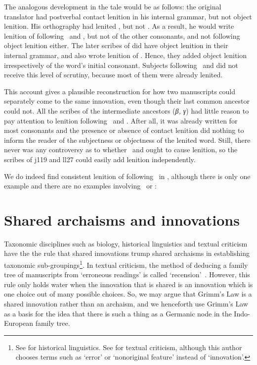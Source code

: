 The analogous development in the tale  would be as follows: the original translator had postverbal contact lenition in his internal grammar, but not object lenition. His orthography had lenited , but not . As a result, he would write lenition of  following \ei\ and , but not of the other consonants, and not following object lenition either. The later scribes of  did have object lenition in their internal grammar, and also wrote lenition of . Hence, they added object lenition irrespectively of the word's initial consonant. Subjects following \ei\ and  did not receive this level of scrutiny, because most of them were already lenited.

This account gives a plausible reconstruction for how two manuscripts could separately come to the same innovation, even though their last common ancestor could not. All the scribes of the intermediate ancestors (\textit{β, γ}) had little reason to pay attention to lenition following \ei\ and . After all, it was already written for most consonants and the presence or absence of contact lenition did nothing to inform the reader of the subjectness or objectness of the lenited word. Still, there never was any controversy as to whether \ei\ and  ought to cause lenition, so the scribes of \gls{j119} and \gls{ll27} could easily add lenition independently.

We do indeed find consistent lenition of  following \ei\ in , although there is only one example and there are no examples involving \oes\ or :

\begin{mwl}
\end{mwl}

\section{Shared archaisms and innovations}
\label{sec:shar-innov-arch}

Taxonomic disciplines such as biology, historical linguistics and textual criticism  have the the rule that shared innovations trump shared archaisms in establishing taxonomic sub-groupings\footnote{See \eg \textcite[169]{MT_Trask15} for historical linguistics. See \eg \textcite[103--104, 107]{Tar_Classical95} for textual criticism, although this author chooses terms such as `error' or `nonoriginal feature' instead of `innovation'.}. In textual criticism, the method of deducing a family tree of manuscripts from `erroneous readings' is called `recension'~\autocite[232]{Sar_Manuscript13}. However, this rule only holds water when the innovation that is shared is an innovation which is one choice out of many possible choices. So,  we may argue that \eg Grimm's Law is a shared innovation rather than an archaism, and we henceforth use Grimm's Law as a basis for the idea that there is such a thing as a Germanic node in the Indo-European family tree.

